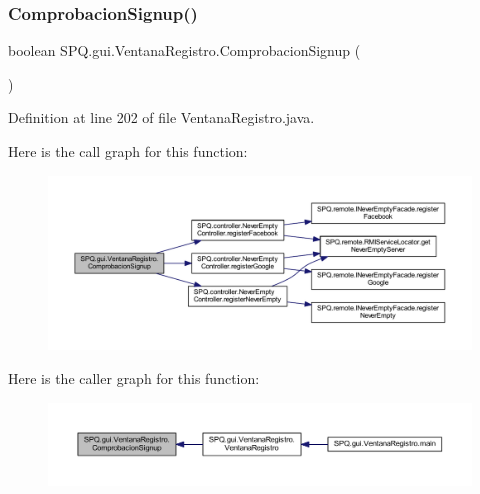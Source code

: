 \subsubsection{\texorpdfstring{Comprobacion\+Signup()}{ComprobacionSignup()}}
{\footnotesize\ttfamily boolean S\+P\+Q.\+gui.\+Ventana\+Registro.\+Comprobacion\+Signup (\begin{DoxyParamCaption}{ }\end{DoxyParamCaption})}



Definition at line 202 of file Ventana\+Registro.\+java.

Here is the call graph for this function\+:\nopagebreak
\begin{figure}[H]
\begin{center}
\leavevmode
\includegraphics[width=350pt]{class_s_p_q_1_1gui_1_1_ventana_registro_a409053f213651ce392699ee8c4f07e66_cgraph}
\end{center}
\end{figure}
Here is the caller graph for this function\+:\nopagebreak
\begin{figure}[H]
\begin{center}
\leavevmode
\includegraphics[width=350pt]{class_s_p_q_1_1gui_1_1_ventana_registro_a409053f213651ce392699ee8c4f07e66_icgraph}
\end{center}
\end{figure}
\mbox{\label{class_s_p_q_1_1gui_1_1_ventana_registro_ac33d30ad4e6980a453a3a6c3de20f468}} 
